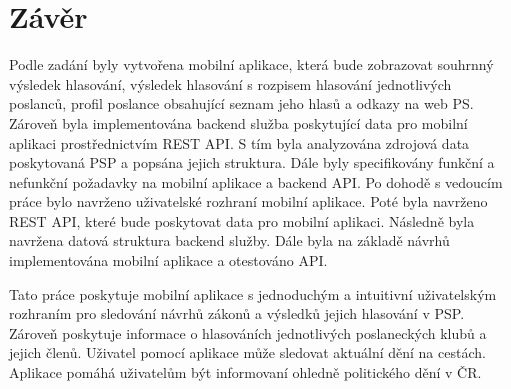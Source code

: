 \chapter{Závěr}

Podle zadání byly vytvořena mobilní aplikace, která bude zobrazovat  souhrnný výsledek hlasování, výsledek hlasování s rozpisem hlasování jednotlivých poslanců, profil poslance obsahující seznam jeho hlasů a odkazy na web PS. Zároveň byla implementována backend služba poskytující data pro mobilní aplikaci prostřednictvím REST API. S tím byla analyzována zdrojová data poskytovaná PSP a popsána jejich struktura. Dále byly specifikovány funkční a nefunkční požadavky na mobilní aplikace a backend API. Po dohodě s vedoucím práce bylo navrženo uživatelské rozhraní mobilní aplikace. Poté byla navrženo REST API, které bude poskytovat data pro mobilní aplikaci. Následně byla navržena datová struktura backend služby. Dále byla na základě návrhů implementována mobilní aplikace a otestováno API.

Tato práce poskytuje mobilní aplikace s jednoduchým a intuitivní uživatelským rozhraním pro sledování návrhů zákonů a výsledků jejich hlasování v PSP. Zároveň poskytuje informace o hlasováních jednotlivých poslaneckých klubů a jejich členů. Uživatel pomocí aplikace může sledovat aktuální dění na cestách. Aplikace pomáhá uživatelům být informovaní ohledně politického dění v ČR.